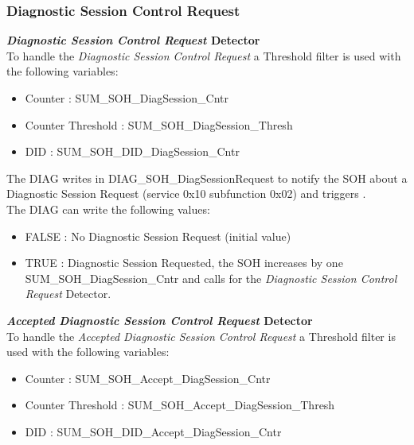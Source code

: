 \subsubsection{Diagnostic Session Control Request}
{
    \textbf{\textit{Diagnostic Session Control Request} Detector}\\
    To handle the \textit{Diagnostic Session Control Request} a Threshold filter is used  with the following variables:
    \begin{itemize}
        \item Counter               : SUM_SOH_DiagSession_Cntr
        \item Counter Threshold     : SUM_SOH_DiagSession_Thresh
        \item DID                   : SUM_SOH_DID_DiagSession_Cntr
    \end{itemize}
}
{
       
}

The DIAG writes in DIAG_SOH_DiagSessionRequest to notify the SOH about a Diagnostic Session Request (service 0x10 subfunction 0x02) and triggers .\\
The DIAG can write the following values:
\begin{itemize}
	\item FALSE		:	No Diagnostic Session Request (initial value)
	\item TRUE		:	Diagnostic Session Requested, the SOH increases by one SUM_SOH_DiagSession_Cntr and calls  for the \textit{Diagnostic Session Control Request} Detector.
\end{itemize}

{
    \textbf{\textit{Accepted Diagnostic Session Control Request} Detector}\\
    To handle the \textit{Accepted Diagnostic Session Control Request} a Threshold filter is used  with the following variables:
    \begin{itemize}
        \item Counter               : SUM_SOH_Accept_DiagSession_Cntr
        \item Counter Threshold     : SUM_SOH_Accept_DiagSession_Thresh
        \item DID                   : SUM_SOH_DID_Accept_DiagSession_Cntr
    \end{itemize}
}
{
      
}

